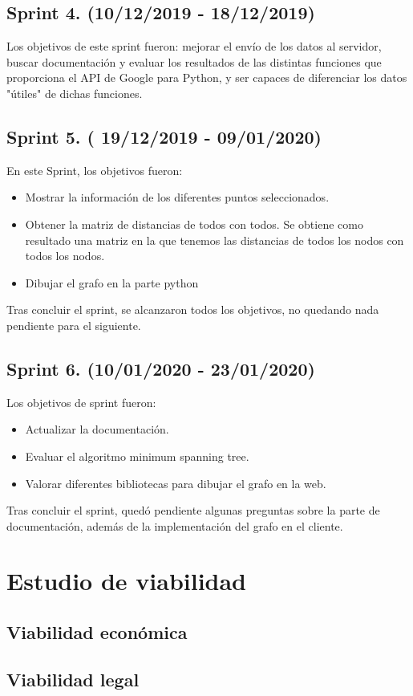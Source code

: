 \subsection{Sprint 4. (10/12/2019 - 18/12/2019)}
Los objetivos de este sprint fueron: mejorar el envío de los datos al servidor, buscar documentación y evaluar los resultados de las distintas funciones que proporciona el API de Google para Python, y ser capaces de diferenciar los datos "útiles" de dichas funciones.

\subsection{Sprint 5. ( 19/12/2019 - 09/01/2020)}
En este Sprint, los objetivos fueron:
\begin{itemize}
	\item Mostrar la información de los diferentes puntos seleccionados.
	\item Obtener la matriz de distancias de todos con todos. Se obtiene como resultado una matriz en la que tenemos las distancias de todos los nodos con todos los nodos.
	\item Dibujar el grafo en la parte python
\end{itemize}
Tras concluir el sprint, se alcanzaron todos los objetivos, no quedando nada pendiente para el siguiente.
\subsection{Sprint 6. (10/01/2020 - 23/01/2020)}
Los objetivos de sprint fueron:
\begin{itemize}
	\item Actualizar la documentación.
	\item Evaluar el algoritmo minimum spanning tree.
	\item Valorar diferentes bibliotecas para dibujar el grafo en la web.
\end{itemize}
Tras concluir el sprint, quedó pendiente algunas preguntas sobre la parte de documentación, además de la implementación del grafo en el cliente.

\section{Estudio de viabilidad}

\subsection{Viabilidad económica}

\subsection{Viabilidad legal}


